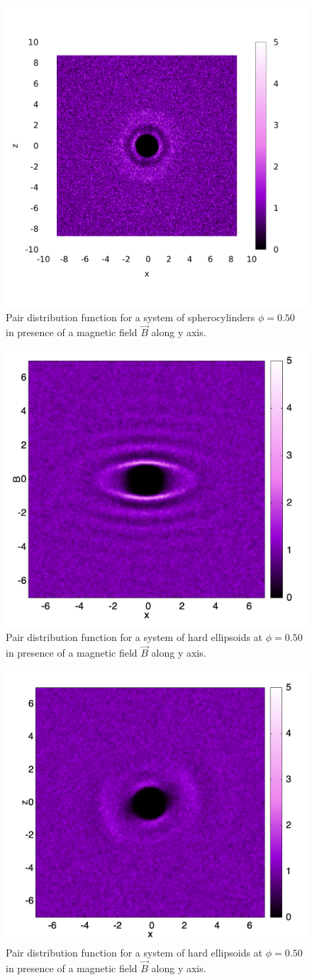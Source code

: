 \documentclass[aip,graphicx]{revtex4-1} %
\begin{document}
\begin{figure}
    \centering
    \includegraphics[width=0.5\columnwidth]{gxz_B.png}
    \caption{Pair distribution function for a system of spherocylinders $\phi = 0.50$ in presence of a magnetic field $\vec{B}$ along y axis.}\label{fig:gxz_B}
\end{figure}

\begin{figure}
    \begin{center}
    \includegraphics[width=0.4\columnwidth]{gyz_B_HE.png}
    \caption{Pair distribution function for a system of hard ellipsoids at $\phi = 0.50$ in presence of a magnetic field $\vec{B}$ along y axis.}\label{fig:gyz_B_HE}
    \end{center}
\end{figure}


\begin{figure}
    \centering
    \includegraphics[width=0.4\columnwidth]{gxz_B_HE.png}
    \caption{Pair distribution function for a system of hard ellipsoids at $\phi = 0.50$ in presence of a magnetic field $\vec{B}$ along y axis.}\label{fig:gxz_B_HE}
\end{figure}
\end{document}
